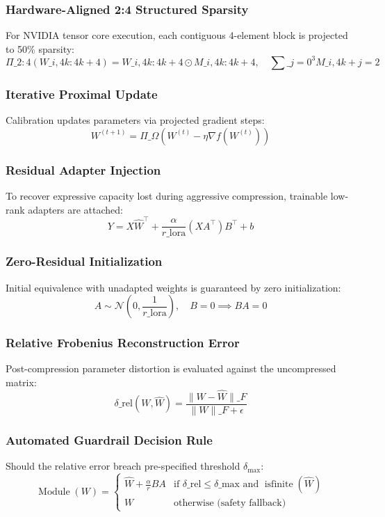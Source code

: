 \subsubsection{Hardware-Aligned 2:4 Structured Sparsity}
For NVIDIA tensor core execution, each contiguous 4-element block is projected to 50\% sparsity:
\[
\Pi\_{2:4}(W\_{i, 4k:4k+4}) = W\_{i, 4k:4k+4} \odot M\_{i, 4k:4k+4}, \quad \sum\_{j=0}^{3} M\_{i, 4k+j} = 2
\]

\subsubsection{Iterative Proximal Update}
Calibration updates parameters via projected gradient steps:
\[
W^{(t+1)} = \Pi\_{\Omega}\left( W^{(t)} - \eta \nabla f(W^{(t)}) \right)
\]

\subsubsection{Residual Adapter Injection}
To recover expressive capacity lost during aggressive compression, trainable low-rank adapters are attached:
\[
Y = X \hat{W}^\top + \frac{\alpha}{r\_{\text{lora}}} (X A^\top) B^\top + b
\]

\subsubsection{Zero-Residual Initialization}
Initial equivalence with unadapted weights is guaranteed by zero initialization:
\[
A \sim \mathcal{N}\left(0, \frac{1}{r\_{\text{lora}}}\right), \quad B = 0 \implies B A = 0
\]

\subsubsection{Relative Frobenius Reconstruction Error}
Post-compression parameter distortion is evaluated against the uncompressed matrix:
\[
\delta\_{\text{rel}}(W, \hat{W}) = \frac{\|W - \hat{W}\|\_F}{\|W\|\_F + \epsilon}
\]

\subsubsection{Automated Guardrail Decision Rule}
Should the relative error breach pre-specified threshold $\delta_{\text{max}}$:
\[
\operatorname{Module}(W) = \begin{cases} \hat{W} + \frac{\alpha}{r} B A & \text{if } \delta\_{\text{rel}} \le \delta\_{\text{max}} \text{ and } \operatorname{isfinite}(\hat{W}) \\ W & \text{otherwise (safety fallback)} \end{cases}
\]

